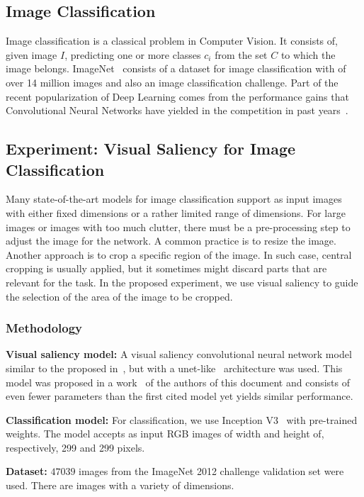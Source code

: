 \documentclass[12pt]{article}
\begin{document}
\subsection{Image Classification}
Image classification is a classical problem in Computer Vision.
It consists of, given image $I$, predicting one or more classes
$c_i$ from the set $C$ to which the image belongs.
ImageNet~\cite{ref:imagenet-dset} consists of a dataset for image classification with of over 14 million images
and also an image classification challenge.
Part of the recent popularization of Deep Learning comes from the performance gains that
Convolutional Neural Networks have yielded in the competition
in past years~\cite{ref:imagenet}\cite{ref:inceptionv3}.

\subsection{Experiment: Visual Saliency for Image Classification}
Many state-of-the-art models for image classification support as input images with either fixed dimensions
or a rather limited range of dimensions.
For large images or images with too much clutter, there must be a pre-processing step to
adjust the image for the network.
A common practice is to resize the image.
Another approach is to crop a specific region of the image.
In such case, central cropping is usually applied, but it sometimes might discard parts that
are relevant for the task.
In the proposed experiment, we use visual saliency to guide the selection of the area of the image to
be cropped.

\subsubsection{Methodology}

\textbf{Visual saliency model:}
A visual saliency convolutional neural network model similar to the proposed in~\cite{ref:erik-esther},
but with a unet-like~\cite{ref:unet} architecture was used.
This model was proposed in a work~\cite{ref:ic-erik} of the authors of this document
and consists of even fewer parameters than the first cited model yet yields similar performance.

\textbf{Classification model:}
For classification, we use Inception V3~\cite{ref:inceptionv3} with pre-trained weights.
The model accepts as input RGB images of width and height of, respectively, 299 and 299 pixels.

\textbf{Dataset:}
$47039$ images from the ImageNet 2012 challenge validation set were used.
There are images with a variety of dimensions.
\end{document}

